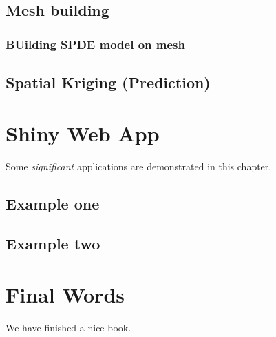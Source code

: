 \documentclass[
  12pt,
  a4paper,
  oneside]{book}
\begin{document}
\hypertarget{mesh-building}{%
\section{Mesh building}\label{mesh-building}}

\hypertarget{building-spde-model-on-mesh}{%
\subsection{BUilding SPDE model on mesh}\label{building-spde-model-on-mesh}}

\hypertarget{spatial-kriging-prediction}{%
\section{Spatial Kriging (Prediction)}\label{spatial-kriging-prediction}}

\hypertarget{application}{%
\chapter{Shiny Web App}\label{application}}

Some \emph{significant} applications are demonstrated in this chapter.

\hypertarget{example-one}{%
\section{Example one}\label{example-one}}

\hypertarget{example-two}{%
\section{Example two}\label{example-two}}

\hypertarget{final-words}{%
\chapter{Final Words}\label{final-words}}

We have finished a nice book.

  
\end{document}
